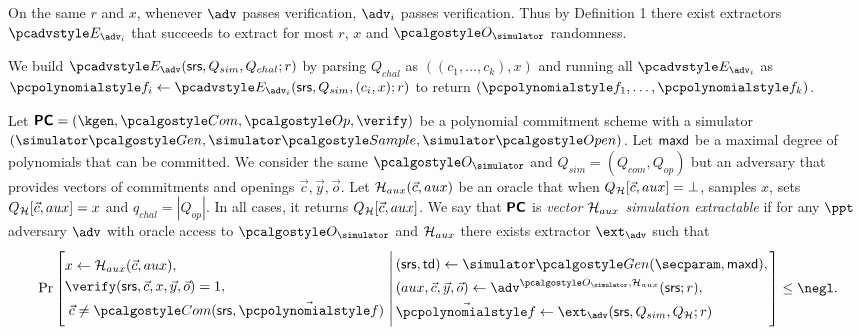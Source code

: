 \documentclass[runningheads,11pt]{llncs}
\let\spvec\vec \let\vec\accentvec
\let\vec\spvec
\begin{document}
On the same $r$ and $x$, whenever $\adv$ passes verification, $\adv_{i}$ passes verification.  Thus by Definition 1 there exist extractors $\Ext_{\adv_{i}}$ that succeeds to extract for most $r$, $x$ and $\oracles$ randomness.

We build $\Ext_{\adv}(\srs, Q_{sim}, Q_{chal}; r)$ by parsing $Q_{chal}$ as $((c_{1},\dots, c_{k}), x)$ and running all $\Ext_{\adv_{i}}$ as $\p{f}_{i}\gets \Ext_{\adv_{i}}(\srs,Q_{sim},(c_{i},x); r)$ to return $(\p{f}_{1},\dots,\p{f}_{k})$.

\begin{definition}
  \label{def:sepcom}
  Let $\PCOM = (\kgen, \com, \open, \verify)$ be a polynomial commitment
  scheme with a simulator $(\simgen, \simsample, \simopen)$. Let $\mathsf{maxd}$ be a maximal degree of polynomials that can be
  committed. 
  We consider the same $\oracles$ and $Q_{sim}= (Q_{com},Q_{op})$ but an adversary that provides vectors of commitments and openings $\vec{c}, \vec{y}, \vec{o}$.
   Let $\ro_{aux}(\vec{c},aux)$ be an oracle that when $Q_{\ro}[\vec{c},aux] = \bot$, samples $x$, sets $Q_{\ro}[\vec{c},aux]=x$ and $q_{{chal}}= |Q_{{op}}|$. In all cases, it returns $Q_{\ro}[\vec{c},aux]$.
  We say that $\bm{\mathsf{PC}}$ is \emph{vector $\mathcal{H}_{aux}$ simulation extractable} if for any $\ppt$
  adversary $\adv$ with oracle access to $\oracles$ and $\mathcal{H}_{aux}$ there exists extractor
  $\ext_{\adv}$ such that
\[
  \Pr \left[
    \begin{aligned}
      & x \gets \ro_{aux}(\vec{c},aux), \\
      & \verify(\srs, \vec{c}, x, \vec{y}, \vec{o}) = 1, \\
      & \;\vec{c} \neq \com(\srs, \vec{\p{f}})\\
    \end{aligned}
    \,\left|\,
      \vphantom{
        \begin{aligned}
          & \\
          & \\
          & \\
          &
        \end{aligned}
        }
    \begin{aligned}
      & (\srs, \td) \gets \simgen(\secparam, \maxdeg),\\
      & (aux,\vec{c},\vec{y}, \vec{o}) \gets \adv^{\oracles,\ro_{aux}}(\srs; r), \\
      & \vec{\p{f}} \gets \ext_\adv(\srs, Q_{sim}, Q_{\ro}; r)
    \end{aligned}
  \right.\right]
  \leq \negl.
\]
\end{definition}
\end{document}

